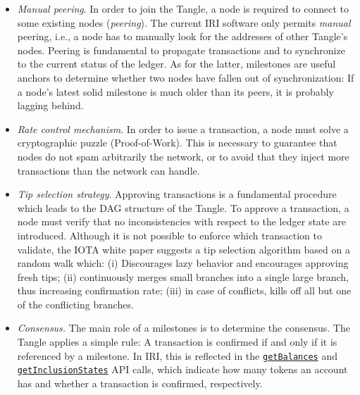 \documentclass[../main.tex]{subfiles}
\begin{document}
\begin{itemize}
	
	\item \textit{Manual peering}. In order to join the Tangle, a node is required to connect to some existing nodes (\textit{peering}). The current IRI software only permits \textit{manual} peering, i.e., a node has to manually look for the addresses of other Tangle's nodes. Peering is fundamental to propagate transactions and to synchronize to the current status of the ledger. As for the latter, milestones are useful anchors to determine whether two nodes have fallen out of synchronization: If a node’s latest solid milestone is much older than its peers, it is probably lagging behind.
	
	\item \textit{Rate control mechanism}. In order to issue a transaction, a node must solve a cryptographic puzzle (Proof-of-Work). This is necessary to guarantee that nodes do not spam arbitrarily the network, or to avoid that they inject more transactions than the network can handle.
	
	\item \textit{Tip selection strategy}. Approving transactions is a fundamental procedure which leads to the DAG structure of the Tangle. To approve a transaction, a node must verify that no inconsistencies with respect to the ledger state are introduced. Although it is not possible to enforce which transaction to validate, the IOTA white paper suggests a tip selection algorithm based on a random walk which: (i) Discourages lazy behavior and encourages approving fresh tips; (ii) continuously merges small branches into a single large branch, thus increasing confirmation rate; (iii) in case of conflicts, kills off all but one of the conflicting branches.%
	
	\item \textit{Consensus.} The main role of a milestones is to determine the consensus. The Tangle applies a simple rule: A transaction is confirmed if and only if it is referenced by a milestone. In IRI, this is reflected in the \href{https://docs.iota.org/docs/iri/0.1/references/api-reference\#getbalances}{\texttt{getBalances}} and \href{https://docs.iota.org/docs/iri/0.1/references/api-reference\#getinclusionstates}{\texttt{getInclusionStates}} API calls, which indicate how many tokens an account has and whether a transaction is confirmed, respectively.
	
\end{itemize}
\end{document}
